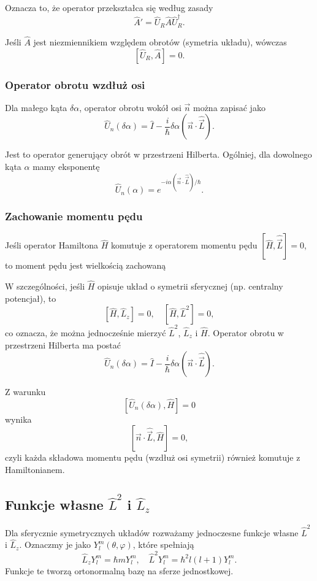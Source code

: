 Oznacza to, że operator przekształca się według zasady
$$
\hat{A}' = \hat{U}_R \hat{A} \hat{U}_R^\dagger.
$$

Jeśli $\hat{A}$ jest niezmiennikiem względem obrotów (symetria układu), wówczas
$$
[\hat{U}_R, \hat{A}] = 0.
$$

\subsubsection*{Operator obrotu wzdłuż osi}
Dla małego kąta $\delta\alpha$, operator obrotu wokół osi $\vec{n}$ można zapisać jako
$$
\hat{U}_n(\delta\alpha) = \hat{I} - \frac{i}{\hbar} \delta\alpha (\vec{n} \cdot \hat{\vec{L}}).
$$

Jest to operator generujący obrót w przestrzeni Hilberta.
Ogólniej, dla dowolnego kąta $\alpha$ mamy eksponentę
$$
\hat{U}_n(\alpha) = e^{-i \alpha (\vec{n} \cdot \hat{\vec{L}})/\hbar}.
$$

\subsubsection*{Zachowanie momentu pędu}
Jeśli operator Hamiltona $\hat{H}$ komutuje z operatorem momentu pędu
$ [\hat{H}, \hat{\vec{L}}] = 0 $, to moment pędu jest wielkością zachowaną

W szczególności, jeśli $\hat{H}$ opisuje układ o symetrii sferycznej
(np. centralny potencjał), to
$$
[\hat{H}, \hat{L}_z] = 0, \quad [\hat{H}, \hat{L}^2] = 0,
$$
co oznacza, że można jednocześnie mierzyć $\hat{L}^2$, $\hat{L}_z$ i $\hat{H}$. Operator obrotu w przestrzeni Hilberta ma postać
$$
\hat{U}_n(\delta \alpha) = \hat{I} - \frac{i}{\hbar} \delta \alpha (\vec{n} \cdot \hat{\vec{L}}).
$$

Z warunku
$$
[\hat{U}_n(\delta \alpha), \hat{H}] = 0
$$
wynika
$$
[\vec{n} \cdot \hat{\vec{L}}, \hat{H}] = 0,
$$
czyli każda składowa momentu pędu (wzdłuż osi symetrii) również komutuje z Hamiltonianem.


\subsection{Funkcje własne \texorpdfstring{$\hat{L}^2$}{L2} i \texorpdfstring{$\hat{L}_z$}{Lz}}

Dla sferycznie symetrycznych układów rozważamy jednoczesne funkcje własne $\hat{L}^2$ i $\hat{L}_z$. Oznaczmy je jako $Y_{l}^{m}(\theta, \varphi)$, które spełniają
$$
\hat{L}_z Y_{l}^{m} = \hbar m Y_{l}^{m}, \quad \hat{L}^2 Y_{l}^{m} = \hbar^2 l(l+1) Y_{l}^{m}.
$$
Funkcje te tworzą ortonormalną bazę na sferze jednostkowej.

